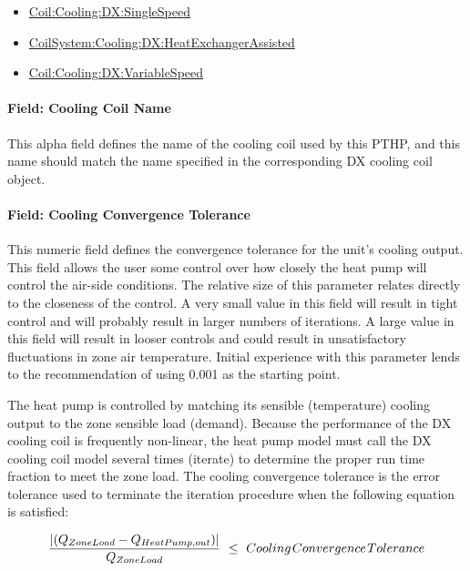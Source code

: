 \begin{itemize}
\item
  \hyperref[coilcoolingdxsinglespeed]{Coil:Cooling:DX:SingleSpeed}
\item
  \hyperref[coilsystemcoolingdxheatexchangerassisted]{CoilSystem:Cooling:DX:HeatExchangerAssisted}
\item
  \hyperref[coilcoolingdxvariablespeed]{Coil:Cooling:DX:VariableSpeed}
\end{itemize}

\paragraph{Field: Cooling Coil Name}\label{field-cooling-coil-name-3-000}

This alpha field defines the name of the cooling coil used by this PTHP, and this name should match the name specified in the corresponding DX cooling coil object.

\paragraph{Field: Cooling Convergence Tolerance}\label{field-cooling-convergence-tolerance-3}

This numeric field defines the convergence tolerance for the unit's cooling output. This field allows the user some control over how closely the heat pump will control the air-side conditions. The relative size of this parameter relates directly to the closeness of the control. A very small value in this field will result in tight control and will probably result in larger numbers of iterations. A large value in this field will result in looser controls and could result in unsatisfactory fluctuations in zone air temperature. Initial experience with this parameter lends to the recommendation of using 0.001 as the starting point.

The heat pump is controlled by matching its sensible (temperature) cooling output to the zone sensible load (demand). Because the performance of the DX cooling coil is frequently non-linear, the heat pump model must call the DX cooling coil model several times (iterate) to determine the proper run time fraction to meet the zone load. The cooling convergence tolerance is the error tolerance used to terminate the iteration procedure when the following equation is satisfied:

\begin{equation}
\frac{{\left| {({Q_{ZoneLoad}} - {Q_{HeatPump,out}})} \right|}}{{{Q_{ZoneLoad}}}}\,\, \le \,\,Cooling{\kern 1pt} Convergence{\kern 1pt} Tolerance
\end{equation}

